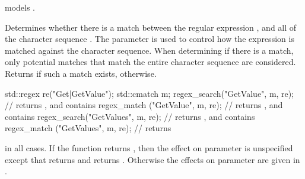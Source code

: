 \begin{itemdescr}
\pnum
\expects
{} models
.

\pnum
\effects
Determines whether there is a match between the
regular expression , and all of the character
sequence . The parameter  is
used to control how the expression is matched against the character
sequence. When determining if there is a match, only potential matches
that match the entire character sequence are considered.
Returns  if such a match exists, 
otherwise.
\begin{example}
\begin{codeblock}
std::regex re("Get|GetValue");
std::cmatch m;
regex_search("GetValue", m, re);        // returns , and  contains 
regex_match ("GetValue", m, re);        // returns , and  contains 
regex_search("GetValues", m, re);       // returns , and  contains 
regex_match ("GetValues", m, re);       // returns 
\end{codeblock}
\end{example}

\pnum
\ensures
{} in all cases.
If the function returns , then the effect
on parameter  is unspecified except that 
returns  and  returns .
Otherwise the effects on parameter  are given in
.
\end{itemdescr}

